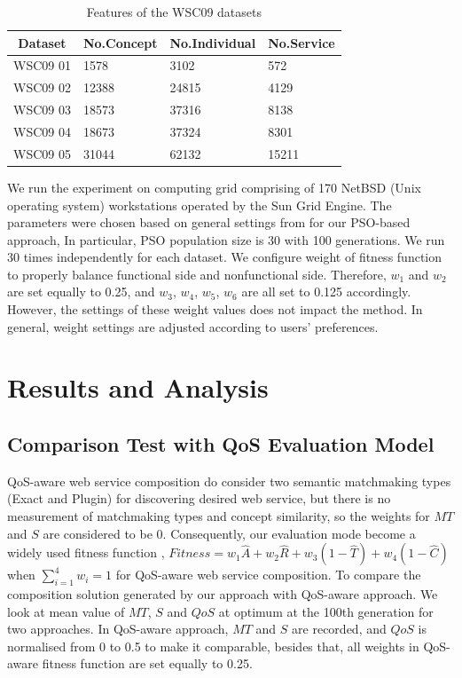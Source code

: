 \documentclass{IEEEtran}
\begin{document}
\begin{table}[]
\centering
\caption{Features of the WSC09 datasets}
\label{wsc09datasetTable}
\begin{tabular}{l|l|l|l}
\hline
\multicolumn{1}{c|}{Dataset} & No.Concept & No.Individual & No.Service \\ \hline
WSC09 01                     & 1578       &3102           &572      \\ \hline
WSC09 02                     & 12388      &24815          &4129      \\ \hline
WSC09 03                     & 18573      &37316          &8138      \\ \hline
WSC09 04                     & 18673      &37324          &8301      \\ \hline
WSC09 05                     & 31044      &62132          &15211    \\ \hline
\end{tabular}
\end{table}

We run the experiment on computing grid comprising of 170 NetBSD (Unix operating system) workstations operated by the Sun Grid Engine. The parameters were chosen based on general settings from \cite{shi2001particle} for our PSO-based approach, In particular, PSO population size is 30 with 100 generations. We run 30 times independently for each dataset. We configure weight of fitness function to properly balance functional side and nonfunctional side. Therefore, $w_{1}$ and $w_{2}$ are set equally to 0.25, and $w_{3}$, $w_{4}$, $w_{5}$, $w_{6}$ are all set to 0.125 accordingly. However, the settings of these weight values does not impact the method. In general, weight settings are adjusted according to users' preferences.


\section{Results and Analysis}\label{results_analysis}
\subsection{Comparison Test with QoS Evaluation Model}\label{comparisonTest}
QoS-aware web service composition \cite{da2016particle,da2015graphevol,yu2013adaptive,ma2015hybrid} do consider two semantic matchmaking types (Exact and Plugin) for discovering desired web service, but there is no measurement of matchmaking types and concept similarity, so the weights for $MT$ and $S$ are considered to be 0. Consequently, our evaluation mode become a widely used fitness function \cite{ma2015hybrid, da2016particle}, $Fitness = w_1 \hat{A} + w_2 \hat{R} + w_3(1 - \hat{T}) + w_4(1 - \hat{C})$ when $\sum_{i=1}^{4} w_i = 1$  for QoS-aware web service composition. To compare the composition solution generated by our approach with QoS-aware approach. We look at mean value of $MT$, $S$ and $QoS$ at optimum at the 100th generation for two approaches. In QoS-aware approach, $MT$ and $S$ are recorded, and $QoS$ is normalised from 0 to 0.5 to make it comparable, besides that, all weights in QoS-aware fitness function are set equally to 0.25.
\end{document}
